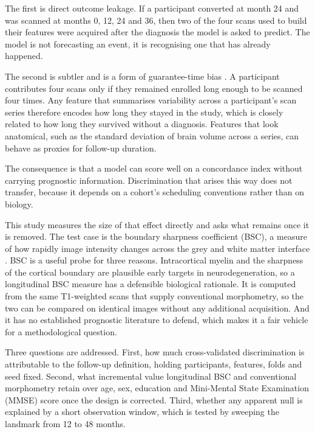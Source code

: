 \documentclass[blue]{ludusofficial}
\begin{document}
The first is direct outcome leakage. If a participant converted at month 24 and was scanned at months 0, 12, 24 and 36, then two of the four scans used to build their features were acquired after the diagnosis the model is asked to predict. The model is not forecasting an event, it is recognising one that has already happened.

The second is subtler and is a form of guarantee-time bias \cite{anderson1983analysis, giobbie2013guarantee}. A participant contributes four scans only if they remained enrolled long enough to be scanned four times. Any feature that summarises variability across a participant's scan series therefore encodes how long they stayed in the study, which is closely related to how long they survived without a diagnosis. Features that look anatomical, such as the standard deviation of brain volume across a series, can behave as proxies for follow-up duration.

The consequence is that a model can score well on a concordance index without carrying prognostic information. Discrimination that arises this way does not transfer, because it depends on a cohort's scheduling conventions rather than on biology.

This study measures the size of that effect directly and asks what remains once it is removed. The test case is the boundary sharpness coefficient (BSC), a measure of how rapidly image intensity changes across the grey and white matter interface \cite{olafson2021bsc}. BSC is a useful probe for three reasons. Intracortical myelin and the sharpness of the cortical boundary are plausible early targets in neurodegeneration, so a longitudinal BSC measure has a defensible biological rationale. It is computed from the same T1-weighted scans that supply conventional morphometry, so the two can be compared on identical images without any additional acquisition. And it has no established prognostic literature to defend, which makes it a fair vehicle for a methodological question.

Three questions are addressed. First, how much cross-validated discrimination is attributable to the follow-up definition, holding participants, features, folds and seed fixed. Second, what incremental value longitudinal BSC and conventional morphometry retain over age, sex, education and Mini-Mental State Examination (MMSE) score once the design is corrected. Third, whether any apparent null is explained by a short observation window, which is tested by sweeping the landmark from 12 to 48 months.
\end{document}
